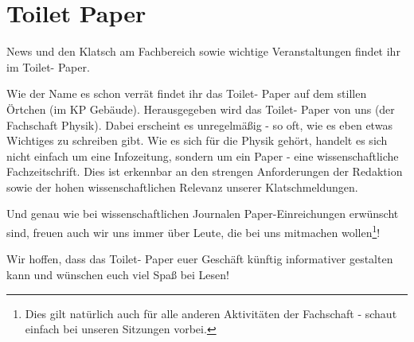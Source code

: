 \vspace{-6ex}
\section{Toilet Paper}
\vspace{-3ex}
\begin{multicols*}{2}
News und den Klatsch am Fachbereich sowie wichtige Veranstaltungen findet ihr im Toilet- Paper.

Wie der Name es schon verrät findet ihr das Toilet- Paper auf dem stillen Örtchen (im KP Gebäude).  
Herausgegeben wird das Toilet- Paper von uns (der Fachschaft Physik). Dabei erscheint es unregelmäßig - so oft, wie es eben etwas Wichtiges zu schreiben gibt. 
Wie es sich für die Physik gehört, handelt es sich nicht einfach um eine Infozeitung, sondern um ein Paper - eine wissenschaftliche Fachzeitschrift. Dies ist erkennbar an den strengen Anforderungen der Redaktion sowie der hohen wissenschaftlichen Relevanz unserer Klatschmeldungen.

Und genau wie bei wissenschaftlichen Journalen Paper-Einreichungen erwünscht sind, freuen auch wir uns immer über Leute, die bei uns mitmachen wollen\footnote{Dies gilt natürlich auch für alle anderen Aktivitäten der Fachschaft - schaut einfach bei unseren Sitzungen vorbei.}!

Wir hoffen, dass das Toilet- Paper euer Geschäft künftig informativer gestalten kann und wünschen euch viel Spaß bei Lesen! 
\end{multicols*}
